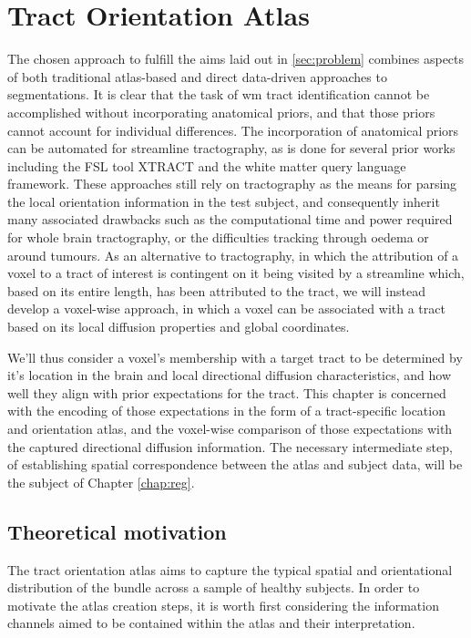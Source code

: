 \chapter{Tract Orientation Atlas}
\label{chap:atlas}


The chosen approach to fulfill the aims laid out in \ref{sec:problem} combines aspects of both traditional atlas-based and direct data-driven approaches to segmentations.
It is clear that the task of \gls{wm} tract identification cannot be accomplished without incorporating anatomical priors, and that those priors cannot account for individual differences.
The incorporation of anatomical priors can be automated for streamline tractography, as is done for several prior works including the FSL tool XTRACT and the white matter query language framework.\autocite{Wassermann2016}
These approaches still rely on tractography as the means for parsing the local orientation information in the test subject, and consequently inherit many associated drawbacks such as the computational time and power required for whole brain tractography, or the difficulties tracking through oedema or around tumours.
As an alternative to tractography, in which the attribution of a voxel to a tract of interest is contingent on it being visited by a streamline which, based on its entire length, has been attributed to the tract, we will instead develop a voxel-wise approach, in which a voxel can be associated with a tract based on its local diffusion properties and global coordinates.

We'll thus consider a voxel's membership with a target tract to be determined by it's location in the brain and local directional diffusion characteristics, and how well they align with prior expectations for the tract.
This chapter is concerned with the encoding of those expectations in the form of a tract-specific location and orientation atlas, and the voxel-wise comparison of those expectations with the captured directional diffusion information.
The necessary intermediate step, of establishing spatial correspondence between the atlas and subject data, will be the subject of Chapter \ref{chap:reg}.

\section{Theoretical motivation}

The tract orientation atlas aims to capture the typical spatial and orientational distribution of the bundle across a sample of healthy subjects.
In order to motivate the atlas creation steps, it is worth first considering the information channels aimed to be contained within the atlas and their interpretation.

